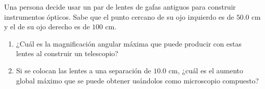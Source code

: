 \item Una persona decide usar un par de lentes de gafas antiguos para construir instrumentos ópticos. Sabe que el punto cercano de su ojo izquierdo es de $50.0\text{ cm}$ y el de su ojo derecho es de $100\text{ cm}$.
\begin{enumerate}
    \item ¿Cuál es la magnificación angular máxima que puede producir con estas lentes al construir un telescopio?
    \item Si se colocan las lentes a una separación de $10.0\text{ cm}$, ¿cuál es el aumento global máximo que se puede obtener usándolos como microscopio compuesto?
\end{enumerate}